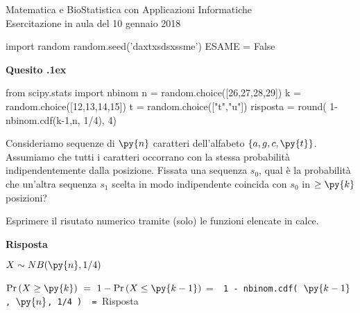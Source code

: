 \documentclass[11pt,twoside,a4paper]{article}
\newcounter{quesito}
\newenvironment{question}{\addtocounter{quesito}{1}\par\textbf{Quesito \thequesito.\kern1ex}}{\vspace{0.5\parskip}}
\newenvironment{answer}{\par\textbf{Risposta\quad}}{\vspace{\parskip}}
\begin{document}
\colorbox{blue!10}{\begin{minipage}{\textwidth}
Matematica e BioStatistica con Applicazioni Informatiche\\
Esercitazione in aula del 10 gennaio 2018
\end{minipage}}



\begin{pycode}
import random
random.seed('daxtxsdsxssme')
ESAME = False
\end{pycode}

\begin{question}
  \begin{pycode}
  from scipy.stats import nbinom
  n = random.choice([26,27,28,29])
  k = random.choice([12,13,14,15])
  t = random.choice(["t","u"])
  risposta = round( 1- nbinom.cdf(k-1,n, 1/4), 4)
  \end{pycode}
  Consideriamo sequenze di $\py{n}$ caratteri dell'alfabeto $\{a,g,c,\py{t}\}$. 
  Assumiamo che tutti i caratteri occorrano con la stessa probabilità indipendentemente dalla posizione.
  Fissata una sequenza $s_0$, qual è la probabilità che un'altra sequenza $s_1$ 
  scelta in modo indipendente coincida con $s_0$ in $\ge\py{k}$ posizioni?   
  
  Esprimere il risutato numerico tramite (solo) le funzioni elencate in calce.
  \begin{answer}
      
    $X\sim NB(\py{n}, 1/4)$
    
    $\Pr(X\ge \py{k})\ =\ 1-\Pr(X\le \py{k-1})$
    \quad =\ 
    {\tt{\color{blue}  1 -  nbinom.cdf( $\py{k-1}$, $\py{n}$, 1/4 )}
    \ =\ 
    \py{risposta}}{\color{blue}\hfill Risposta}
  \end{answer}
  \end{question}
  
\end{document}
